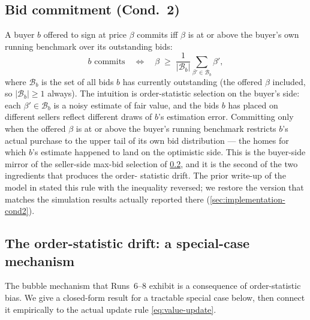 \subsection{Bid commitment (Cond.~2)}
\label{sec:framework-cond2}

A buyer $b$ offered to sign at price $\beta$ commits iff $\beta$ is
at or above the buyer's own running benchmark over its outstanding
bids:
\begin{equation}
\label{eq:cond2}
b \text{ commits} \quad\Longleftrightarrow\quad \beta \;\ge\; \frac{1}{|\mathcal{B}_{b}|}\sum_{\beta' \in \mathcal{B}_{b}} \beta',
\end{equation}
where $\mathcal{B}_{b}$ is the set of all bids $b$ has currently
outstanding (the offered $\beta$ included, so $|\mathcal{B}_{b}| \ge 1$
always). The intuition is order-statistic selection on the buyer's
side: each $\beta' \in \mathcal{B}_{b}$ is a noisy estimate of fair
value, and the bids $b$ has placed on different sellers reflect
different draws of $b$'s estimation error. Committing only when the
offered $\beta$ is at or above the buyer's running benchmark
restricts $b$'s actual purchase to the upper tail of its own bid
distribution --- the homes for which $b$'s estimate happened to
land on the optimistic side. This is the buyer-side mirror of the
seller-side max-bid selection of \cref{sec:framework-asymmetry}, and
it is the second of the two ingredients that produces the order-
statistic drift. The prior write-up of the model in
\citet{arbuzov2018de} stated this rule with the inequality reversed;
we restore the version that matches the simulation results actually
reported there (\cref{sec:implementation-cond2}).

\subsection{The order-statistic drift: a special-case mechanism}
\label{sec:framework-asymmetry}

The bubble mechanism that Runs~6--8 exhibit is a consequence of
order-statistic bias. We give a closed-form result for a tractable
special case below, then connect it empirically to the actual update
rule \cref{eq:value-update}.

